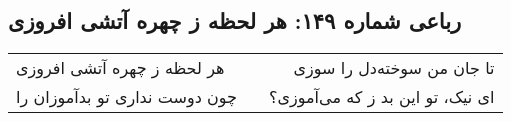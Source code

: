 \begin{center}
\section*{رباعی شماره ۱۴۹: هر لحظه ز چهره آتشی افروزی}
\label{sec:149}
\begin{longtable}{l p{0.5cm} r}
هر لحظه ز چهره آتشی افروزی
&&
تا جان من سوخته‌دل را سوزی
\\
چون دوست نداری تو بدآموزان را
&&
ای نیک، تو این بد ز که می‌آموزی؟
\\
\end{longtable}
\end{center}
